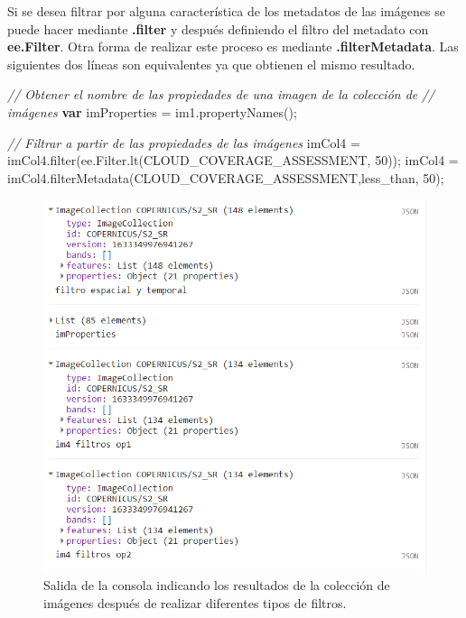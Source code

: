 \documentclass[
  12pt,
  letterpaper,
  twoside]{book}
\newenvironment{Shaded}{\begin{snugshade}}{\end{snugshade}}
\newcommand{\AttributeTok}[1]{\textcolor[rgb]{0.48,0.12,0.64}{#1}}
\newcommand{\CommentTok}[1]{\textcolor[rgb]{0.24,0.58,0.00}{\textit{#1}}}
\newcommand{\ControlFlowTok}[1]{\textcolor[rgb]{0.00,0.00,0.00}{\textbf{#1}}}
\newcommand{\DecValTok}[1]{\textcolor[rgb]{0.28,0.53,0.93}{#1}}
\newcommand{\FunctionTok}[1]{\textcolor[rgb]{0.48,0.12,0.64}{#1}}
\newcommand{\KeywordTok}[1]{\textcolor[rgb]{0.48,0.12,0.64}{#1}}
\newcommand{\NormalTok}[1]{#1}
\newcommand{\OperatorTok}[1]{\textcolor[rgb]{0.00,0.00,0.00}{#1}}
\newcommand{\StringTok}[1]{\textcolor[rgb]{0.87,0.29,0.22}{#1}}
\newcommand\boldpurple[1]{\textcolor{darkpurple}{\textbf{#1}}}
\begin{document}
Si se desea filtrar por alguna característica de los metadatos de las imágenes se puede hacer mediante \boldpurple{.filter} y después definiendo el filtro del metadato con \boldpurple{ee.Filter}. Otra forma de realizar este proceso es mediante \boldpurple{.filterMetadata}. Las siguientes dos líneas son equivalentes ya que obtienen el mismo resultado.

\begin{Shaded}
\begin{Highlighting}[]
\CommentTok{// Obtener el nombre de las propiedades de una imagen de la colección de }
\CommentTok{// imágenes}
\ControlFlowTok{var}\NormalTok{ imProperties }\OperatorTok{=}\NormalTok{ im1}\OperatorTok{.}\FunctionTok{propertyNames}\NormalTok{()}\OperatorTok{;}

\CommentTok{// Filtrar a partir de las propiedades de las imágenes}
\NormalTok{imCol4 }\OperatorTok{=}\NormalTok{ imCol4}\OperatorTok{.}\FunctionTok{filter}\NormalTok{(}\KeywordTok{ee}\OperatorTok{.}\AttributeTok{Filter}\OperatorTok{.}\FunctionTok{lt}\NormalTok{(}\StringTok{\textquotesingle{}CLOUD\_COVERAGE\_ASSESSMENT\textquotesingle{}}\OperatorTok{,} \DecValTok{50}\NormalTok{))}\OperatorTok{;}
\NormalTok{imCol4 }\OperatorTok{=}\NormalTok{ imCol4}\OperatorTok{.}\FunctionTok{filterMetadata}\NormalTok{(}\StringTok{\textquotesingle{}CLOUD\_COVERAGE\_ASSESSMENT\textquotesingle{}}\OperatorTok{,}\StringTok{\textquotesingle{}less\_than\textquotesingle{}}\OperatorTok{,} \DecValTok{50}\NormalTok{)}\OperatorTok{;}
\end{Highlighting}
\end{Shaded}

\begin{figure}[H]

{\centering \includegraphics[width=0.8\linewidth]{Img/filtroEspacialTemporal} 

}

\caption{Salida de la consola indicando los resultados de la colección de imágenes después de realizar diferentes tipos de filtros.}\label{fig:f104}
\end{figure}
\end{document}
